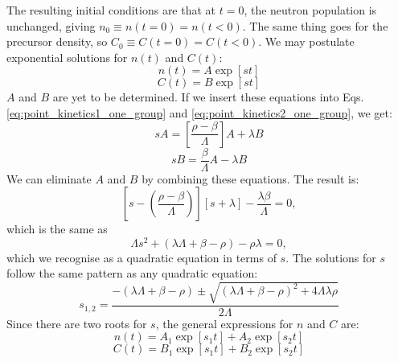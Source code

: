 The resulting initial conditions are that at $t = 0$, the neutron population is unchanged, giving $n_0 \equiv n(t = 0) = n(t < 0)$. The same thing goes for the precursor density, so $C_0 \equiv C(t = 0) = C(t < 0)$. We may postulate exponential solutions for $n(t)$ and $C(t)$:
\begin{equation}
	n(t) = A \exp[st]
\end{equation}
\begin{equation}
	C(t) = B \exp[st]
\end{equation}
$A$ and $B$ are yet to be determined. If we insert these equations into Eqs. \ref{eq:point_kinetics1_one_group} and \ref{eq:point_kinetics2_one_group}, we get:
\begin{equation}
	sA = \left[ \frac{\rho - \beta}{\Lambda} \right] A + \lambda B
\end{equation}
\begin{equation}
	sB = \frac{\beta}{\Lambda} A - \lambda B
\end{equation}
We can eliminate $A$ and $B$ by combining these equations. The result is:
\begin{equation}
	\left[ s - \left( \frac{\rho - \beta}{\Lambda} \right) \right] [s+\lambda] - \frac{\lambda \beta}{\Lambda} = 0,
	\label{eq:s_quadratic1}
\end{equation}
which is the same as
\begin{equation}
	\Lambda s^2 +(\lambda \Lambda + \beta - \rho ) -\rho\lambda = 0,
	\label{eq:s_quadratic2}
\end{equation}
which we recognise as a quadratic equation in terms of $s$. The solutions for $s$ follow the same pattern as any quadratic equation:
\begin{equation}
	s_{1, 2} = \frac{-(\lambda \Lambda + \beta - \rho) \pm \sqrt{(\lambda \Lambda + \beta - \rho)^2 + 4\Lambda\lambda\rho}}{2\Lambda}
	\label{eq:s_solutions}
\end{equation}
Since there are two roots for $s$, the general expressions for $n$ and $C$ are:
\begin{equation}
	n(t) = A_1 \exp[s_1t] + A_2 \exp[s_2t]
\end{equation}
\begin{equation}
	C(t) = B_1 \exp[s_1t] + B_2 \exp[s_2t]
\end{equation}

